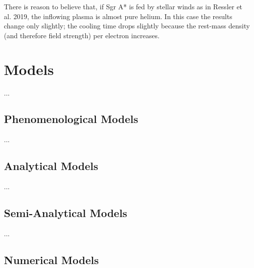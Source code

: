 \documentclass[twocolumn,tighten,dvipsnames]{aastex63}
\newcommand\<{{\langle}}
\renewcommand\>{{\rangle}} %
\begin{document}
There is reason to believe that, if Sgr A* is fed by stellar winds as in Ressler et al. 2019, the inflowing plasma is almost pure helium.  In this case the results change only slightly; the cooling time drops slightly because the rest-mass density (and therefore field strength) per electron increases.

\section{Models}

...

\subsection{Phenomenological Models}

...

\subsection{Analytical Models}

...

\subsection{Semi-Analytical Models}

...

\subsection{Numerical Models}

\end{document}
